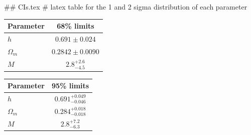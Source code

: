 ## CIs.tex
# latex table for the 1 and 2 sigma distribution of each parameter

\begin{tabular} { l  c}
 Parameter &  68\% limits\\
\hline
{\boldmath$h              $} & $0.691\pm 0.024            $\\
{\boldmath$\Omega_m       $} & $0.2842\pm 0.0090          $\\
{\boldmath$M              $} & $2.8^{+2.6}_{-4.5}         $\\
\hline
\end{tabular}

\begin{tabular} { l  c}
 Parameter &  95\% limits\\
\hline
{\boldmath$h              $} & $0.691^{+0.049}_{-0.046}   $\\
{\boldmath$\Omega_m       $} & $0.284^{+0.018}_{-0.018}   $\\
{\boldmath$M              $} & $2.8^{+7.2}_{-6.3}         $\\
\hline
\end{tabular}

